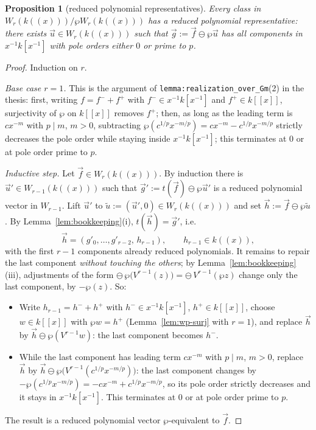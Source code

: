 \documentclass[11pt]{article}
\newcommand{\AS}{\wp}
\newcommand{\vf}{\vec f}
\theoremstyle{plain}
\newtheorem{prop}[theorem]{Proposition}
\theoremstyle{definition}
\begin{document}
\begin{prop}[reduced polynomial representatives]\label{prop:reduced-rep}
Every class in $W_r(k((x)))/\AS W_r(k((x)))$ has a reduced polynomial representative:
there exists $\vec u\in W_r(k((x)))$ such that $\vec g:=\vf\ominus\AS\vec u$ has all
components in $x^{-1}k[x^{-1}]$ with pole orders either $0$ or prime to $p$.
\end{prop}

\begin{proof}
Induction on $r$.

\emph{Base case $r=1$.} This is the argument of
\texttt{lemma:realization\_over\_Gm}(2) in the thesis: first, writing
$f=f^-+f^+$ with $f^-\in x^{-1}k[x^{-1}]$ and $f^+\in k[[x]]$, surjectivity of $\AS$ on
$k[[x]]$ removes $f^+$; then, as long as the leading term is $cx^{-m}$ with $p\mid m$,
$m>0$, subtracting $\AS(c^{1/p}x^{-m/p})=cx^{-m}-c^{1/p}x^{-m/p}$ strictly decreases the
pole order while staying inside $x^{-1}k[x^{-1}]$; this terminates at $0$ or at pole
order prime to $p$.

\emph{Inductive step.} Let $\vf\in W_r(k((x)))$. By induction there is
$\vec u'\in W_{r-1}(k((x)))$ such that $\vec g':=t(\vf)\ominus\AS\vec u'$ is a reduced
polynomial vector in $W_{r-1}$. Lift $\vec u'$ to $\tilde u:=(\vec u',0)\in
W_r(k((x)))$ and set $\vec h:=\vf\ominus\AS\tilde u$. By
Lemma~\ref{lem:bookkeeping}(i), $t(\vec h)=\vec g'$, i.e.
\[
\vec h=(g'_0,\dots,g'_{r-2},\,h_{r-1}),\qquad h_{r-1}\in k((x)),
\]
with the first $r-1$ components already reduced polynomials. It remains to repair the
last component \emph{without touching the others}; by
Lemma~\ref{lem:bookkeeping}(iii), adjustments of the form
$\ominus\,\AS\bigl(V^{r-1}(z)\bigr)=\ominus\,V^{r-1}(\AS z)$ change only the last
component, by $-\AS(z)$. So:
\begin{itemize}
  \item Write $h_{r-1}=h^-+h^+$ with $h^-\in x^{-1}k[x^{-1}]$, $h^+\in k[[x]]$, choose
        $w\in k[[x]]$ with $\AS w=h^+$ (Lemma~\ref{lem:wp-surj} with $r=1$), and replace
        $\vec h$ by $\vec h\ominus\AS(V^{r-1}w)$: the last component becomes $h^-$.
  \item While the last component has leading term $cx^{-m}$ with $p\mid m$, $m>0$,
        replace $\vec h$ by $\vec h\ominus\AS\bigl(V^{r-1}(c^{1/p}x^{-m/p})\bigr)$: the
        last component changes by
        $-\AS(c^{1/p}x^{-m/p})=-cx^{-m}+c^{1/p}x^{-m/p}$, so its pole order strictly
        decreases and it stays in $x^{-1}k[x^{-1}]$. This terminates at $0$ or at pole
        order prime to $p$.
\end{itemize}
The result is a reduced polynomial vector $\AS$-equivalent to $\vf$.
\end{proof}
\end{document}
